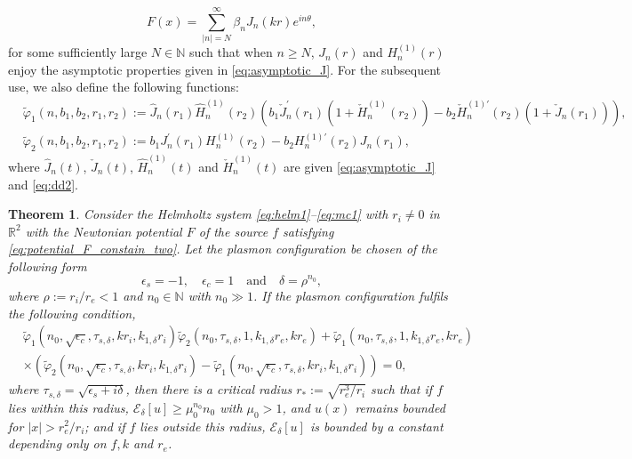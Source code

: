\documentclass[11pt,reqno,twoside]{amsart}
\newtheorem{thm}{Theorem}[section]
\theoremstyle{definition}
\theoremstyle{remark}
\numberwithin{equation}{section}
\begin{document}
\begin{equation}\label{eq:potential_F_constain_two}
 F(x)=\sum_{|n|=N}^{\infty} \beta_n J_n(kr)e^{in\theta},
\end{equation}
for some sufficiently large $N\in\mathbb{N}$ such that when $n\geq N$, $J_n(r)$ and $H_n^{(1)}(r)$ enjoy the asymptotic properties given in \eqref{eq:asymptotic_J}. For the subsequent use, we also define the following functions:
\begin{equation*}
\begin{split}
&\widetilde{\varphi}_1(n,b_1,b_2,r_1,r_2):=\hat{J}_n(r_1) \hat{H}_n^{(1)}(r_2)  \left( b_1 \check{J}_n^{\prime}(r_1)\left(1+\check{H}_n^{(1)}(r_2)\right)   -b_2\check{H}_n^{(1)\prime}(r_2)\left(1+\check{J}_n(r_1)\right) \right),\\
&\widetilde{\varphi}_2(n,b_1,b_2,r_1,r_2):= b_1 J_n^{\prime}(r_1) H_n^{(1)}(r_2) - b_2 H_n^{(1)\prime}(r_2) J_n(r_1) , 
\end{split}
\end{equation*}
where  $\hat{J}_n(t)$, $\check{J}_n(t)$, $\hat{H}_n^{(1)}(t)$ and $\check{H}_n^{(1)}(t)$ are given \eqref{eq:asymptotic_J} and \eqref{eq:dd2}.

\begin{thm}\label{thm:CALR_two}
Consider the Helmholtz system \eqref{eq:helm1}--\eqref{eq:mc1} with $r_i\neq 0$ in $\mathbb{R}^2$ with the Newtonian potential $F$ of the source $f$ satisfying \eqref{eq:potential_F_constain_two}. Let the plasmon configuration be chosen of the following form
 \begin{equation}\label{eq:CALR2d1}
   \epsilon_s=-1, \quad  \epsilon_c=1\quad\mbox{and}\quad \delta=\rho^{n_0},
 \end{equation}
 where $\rho:=r_i/r_e<1$ and $n_0\in \mathbb{N}$ with $n_0\gg 1$. If the plasmon configuration fulfils the following condition,
\begin{equation}\label{eq:k_two}
\begin{split}
&\widetilde{\varphi}_1(n_0,\sqrt{\epsilon_c},\tau_{s,\delta},kr_i,k_{1,\delta} r_i)\widetilde{\varphi}_2(n_0,\tau_{s,\delta},1,k_{1,\delta} r_e,kr_e) + \widetilde{\varphi}_1(n_0,\tau_{s,\delta},1,k_{1,\delta} r_e,kr_e)\\
&\times\left(\widetilde{\varphi}_2(n_0,\sqrt{\epsilon_c},\tau_{s,\delta},k r_i,k_{1,\delta} r_i) - \widetilde{\varphi}_1(n_0,\sqrt{\epsilon_c},\tau_{s,\delta},kr_i,k_{1,\delta} r_i)   \right)=0,
\end{split}
\end{equation}
where $\tau_{s,\delta}=\sqrt{\epsilon_s+i\delta}$, then there is a critical radius $r_{*}:=\sqrt{r_e^3/r_i}$ such that if $f$ lies within this radius, $\mathscr{E}_{\delta}[u]\geq \mu_0^{n_0} n_0$ with $\mu_0>1$, and $u(x)$ remains bounded for $|x|>r_e^2/r_i$; and if $f$ lies outside this radius, $\mathscr{E}_{\delta}[u]$ is bounded by a constant depending only on $f, k$ and $r_e$. 
\end{thm}
\end{document}

